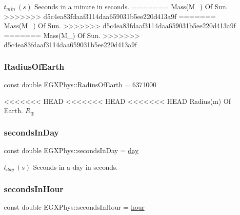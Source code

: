 $t_{min}\ (s)$ Seconds in a minute in seconds. \mbox{\label{namespace_e_g_x_phys_a11a2d4a914eb43c4095e225358293a45}} 
=======
Mass(M\+\_\+) Of Sun. \mbox{\label{namespace_e_g_x_phys_a11a2d4a914eb43c4095e225358293a45}} 
>>>>>>> d5c4ea83fdaaf3114daa659031b5ee220d413a9f
=======
Mass(M\+\_\+) Of Sun. \mbox{\label{namespace_e_g_x_phys_a11a2d4a914eb43c4095e225358293a45}} 
>>>>>>> d5c4ea83fdaaf3114daa659031b5ee220d413a9f
=======
Mass(M\+\_\+) Of Sun. \mbox{\label{namespace_e_g_x_phys_a11a2d4a914eb43c4095e225358293a45}} 
>>>>>>> d5c4ea83fdaaf3114daa659031b5ee220d413a9f
\subsubsection{\texorpdfstring{Radius\+Of\+Earth}{RadiusOfEarth}}
{\footnotesize\ttfamily const double E\+G\+X\+Phys\+::\+Radius\+Of\+Earth = 6371000}

<<<<<<< HEAD
<<<<<<< HEAD
<<<<<<< HEAD
Radius(m) Of Earth. $R_\oplus$ \mbox{\label{namespace_e_g_x_phys_ab4f86327f64403b843077ecc189ce52b}} 
\subsubsection{\texorpdfstring{seconds\+In\+Day}{secondsInDay}}
{\footnotesize\ttfamily const double E\+G\+X\+Phys\+::seconds\+In\+Day = \hyperlink{namespace_e_g_x_phys_a24d985ae6f6cefe7e25ac40806b88f79}{day}}

$t_{day}\ (s)$ Seconds in a day in seconds. \mbox{\label{namespace_e_g_x_phys_a9a6a4eb13636aa068a3f1e41cde4d6fd}} 
\subsubsection{\texorpdfstring{seconds\+In\+Hour}{secondsInHour}}
{\footnotesize\ttfamily const double E\+G\+X\+Phys\+::seconds\+In\+Hour = \hyperlink{namespace_e_g_x_phys_a85c64ea70cddbb7e4c96adcc01cef6e2}{hour}}

